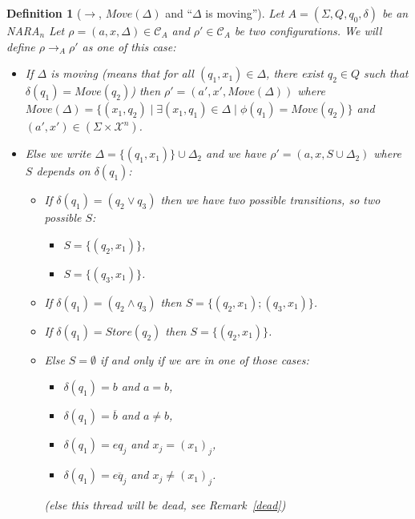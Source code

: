 \documentclass[a4paper,10pt]{report}
\newtheorem{df}{Definition}
\theoremstyle{remark}
\newcommand{\C}{\mathcal{C}_{A}}
\newcommand{\X}{\mathcal{X}^{n}}
\begin{document}
\begin{df}[$\rightarrow$, $Move(\Delta)$ and ``$\Delta$ is moving'']
  Let $A = (\Sigma ,Q ,q_0, \delta )$ be an \textit{NARA}$_n$
  Let $\rho = (a,x,\Delta) \in \C$ and $\rho' \in \C$ be two configurations.
  We will define $\rho \rightarrow_A \rho'$ as one of this case: 
   \begin{itemize}
    \item [$  \rho {\xrightarrow{(a',x')} }_M \ \rho'$  (move)] 
    If $\Delta$ is moving (means that for all $(q_1,x_1) \in \Delta$, there exist $q_2 \in Q$ such that $ \delta(q_1) = Move(q_2)$)
    then $\rho'  = (a',x',Move(\Delta))$ 
    where $Move(\Delta) = \{(x_1,q_2) \mid \exists (x_1,q_1) \in \Delta \mid \phi(q_1) = Move(q_2)\}$ and $(a',x') \in (\Sigma \times \X)$.

    \item [$\rho \rightarrow_{\epsilon}  \rho'$ (epsilon)  ] Else we write $\Delta = \{(q_1,x_1)\} \cup \Delta_2$ and we have  $\rho' = (a,x,S \cup \Delta_2 )$ where $S$ depends on $\delta(q_1)$:  
    \begin{itemize}
    \item [$\rho \rightarrow_\vee  \rho'$ (or)] If $\delta(q_1) = (q_2 \vee q_3)$  then we have two possible transitions, so two possible $S$:
      \begin{itemize}
	\item $S = \{ (q_2,x_1)\}$,   
	\item $S = \{(q_3,x_1) \}$.
      \end{itemize}
    \item [$\rho \rightarrow_\wedge  \rho'$ (and)] If $\delta(q_1) = (q_2 \wedge q_3)$  then $S = \{(q_2,x_1); (q_3,x_1) \} $.
    \item [$\rho \rightarrow_s  \rho'$ (store)] If $\delta(q_1) = Store(q_2)$  then $S =  \{(q_2,x_1)\}$.
 
    \item [$\rho \rightarrow_c \rho'$ (check)] Else $S = \emptyset$ if and only if we are in one of those cases:  
	\begin{itemize}
 	 \item $\delta(q_1) = b$ and $ a= b$,
 	 \item $\delta(q_1) = \overline b$ and $ a \neq b$,
 	 \item $\delta(q_1) = eq_j$ and $x_j = {(x_1)}_j$,
 	 \item $\delta(q_1) = \overline{eq_j}$ and $x_j \neq {(x_1)}_j$.
	\end{itemize}
	 (else this thread will be dead, see Remark~\ref{dead})
    \end{itemize}
   

    
   \end{itemize}


\end{df}
\end{document}
